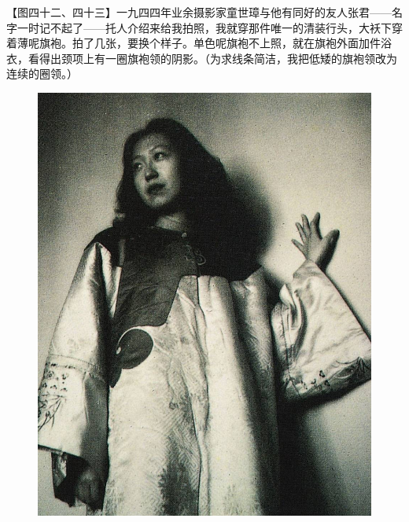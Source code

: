 \clearpage
\par 【图四十二、四十三】一九四四年业余摄影家童世璋与他有同好的友人张君——名字一时记不起了——托人介绍来给我拍照，我就穿那件唯一的清装行头，大袄下穿着薄呢旗袍。拍了几张，要换个样子。单色呢旗袍不上照，就在旗袍外面加件浴衣，看得出颈项上有一圈旗袍领的阴影。（为求线条简洁，我把低矮的旗袍领改为连续的圈领。）
\begin{figure}[htb]
    \centering %
    \includegraphics[scale=0.23]{picture/对照记42.jpeg}

\end{figure}
